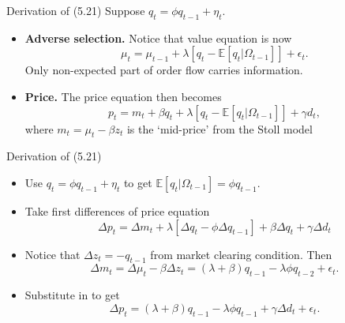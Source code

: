 \documentclass[english,10pt
,aspectratio=169
]{beamer}
\begin{document}
\begin{frame}[label=derivation, noframenumbering]{Derivation of (5.21)}
	Suppose $q_t=\phi q_{t-1}+\eta_{t}$. 
	\begin{itemize}
		\item \textbf{Adverse selection.} Notice that value equation is now
		\[
		\mu_t=\mu_{t-1}+\lambda[q_t-\mathbb{E}[q_t|\Omega_{t-1}]]+\epsilon_t.
		\]
		Only non-expected part of order flow carries information. 
		\item \textbf{Price.} The price equation then becomes
		\[
		p_t=m_t+\beta q_t+\lambda[q_t-\mathbb{E}[q_t|\Omega_{t-1}]]+\gamma d_t,
		\]
		where $m_t=\mu_t-\beta z_t$ is the `mid-price' from the Stoll model 
	\end{itemize}
\end{frame}


\begin{frame}[noframenumbering]{Derivation of (5.21)}
	\begin{itemize}
		\item Use $q_t=\phi q_{t-1}+\eta_{t}$ to get $\mathbb{E}[q_t|\Omega_{t-1}]=\phi q_{t-1}$.
		\item Take first differences of price equation
		\[
		\Delta p_t = \Delta m_t + \lambda [ \Delta q_t-\phi\Delta q_{t-1}]+\beta \Delta q_t+\gamma \Delta d_t
		\]
		\item Notice that $\Delta z_t=-q_{t-1}$ from market clearing condition. Then
		\[
		\Delta m_t = \Delta \mu_t-\beta \Delta z_t = (\lambda+\beta)q_{t-1}-\lambda \phi q_{t-2}+\epsilon_t.
		\]
		\item Substitute in to get
		\[
		\Delta p_t =(\lambda+\beta)q_{t-1} - \lambda\phi  q_{t-1}+\gamma \Delta d_t+\epsilon_t.
		\]
		\hyperlink{extending}{}
	\end{itemize}
\end{frame}
\end{document}
